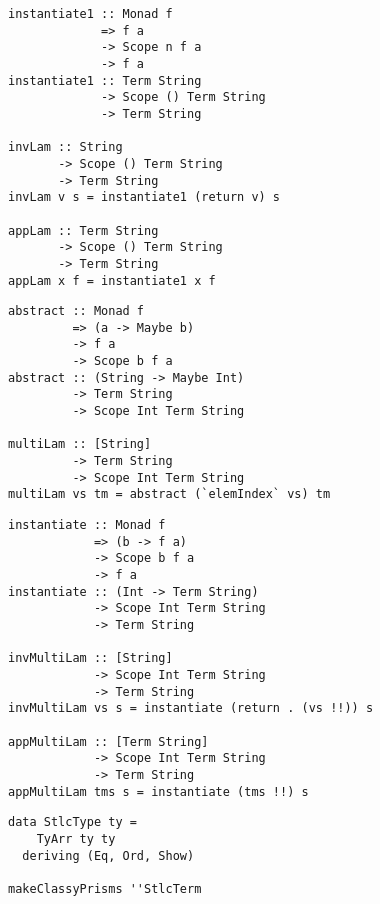 \documentclass{beamer}
\begin{document}
\begin{frame}[fragile]
  \begin{verbatim}
instantiate1 :: Monad f 
             => f a 
             -> Scope n f a 
             -> f a 
instantiate1 :: Term String 
             -> Scope () Term String 
             -> Term String

invLam :: String 
       -> Scope () Term String 
       -> Term String
invLam v s = instantiate1 (return v) s

appLam :: Term String 
       -> Scope () Term String 
       -> Term String
appLam x f = instantiate1 x f
  \end{verbatim}  
\end{frame}

\begin{frame}[fragile]
  \begin{verbatim}
abstract :: Monad f 
         => (a -> Maybe b) 
         -> f a 
         -> Scope b f a 
abstract :: (String -> Maybe Int) 
         -> Term String 
         -> Scope Int Term String

multiLam :: [String] 
         -> Term String 
         -> Scope Int Term String
multiLam vs tm = abstract (`elemIndex` vs) tm
  \end{verbatim}  
\end{frame}

\begin{frame}[fragile]
  \begin{verbatim}
instantiate :: Monad f 
            => (b -> f a) 
            -> Scope b f a 
            -> f a
instantiate :: (Int -> Term String) 
            -> Scope Int Term String 
            -> Term String

invMultiLam :: [String] 
            -> Scope Int Term String 
            -> Term String
invMultiLam vs s = instantiate (return . (vs !!)) s

appMultiLam :: [Term String] 
            -> Scope Int Term String 
            -> Term String
appMultiLam tms s = instantiate (tms !!) s
  \end{verbatim}  
\end{frame}

\begin{frame}[fragile]
  \begin{verbatim}
data StlcType ty =
    TyArr ty ty
  deriving (Eq, Ord, Show)

makeClassyPrisms ''StlcTerm
  \end{verbatim}  
\end{frame}
\end{document}
